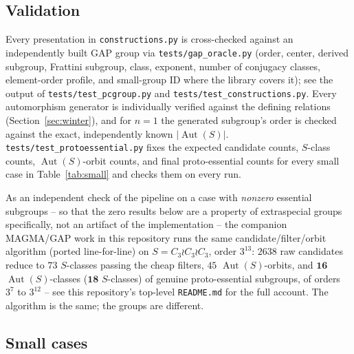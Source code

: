 \documentclass[11pt]{article}
\theoremstyle{remark}
\begin{document}
\subsection{Validation}
\label{sec:validation}

Every presentation in \texttt{constructions.py} is cross-checked against an
independently built GAP group via \texttt{tests/gap\_oracle.py} (order,
center, derived subgroup, Frattini subgroup, class, exponent, number of
conjugacy classes, element-order profile, and small-group ID where the
library covers it); see the output of \texttt{tests/test\_pcgroup.py} and
\texttt{tests/test\_constructions.py}. Every automorphism generator is
individually verified against the defining relations
(Section~\ref{sec:winter}), and for $n=1$ the generated subgroup's order is
checked against the exact, independently known $|\operatorname{Aut}(S)|$.
\texttt{tests/test\_protoessential.py} fixes the expected candidate counts,
$S$-class counts, $\operatorname{Aut}(S)$-orbit counts, and final
proto-essential counts for every small case in Table~\ref{tab:small} and
checks them on every run.

As an independent check of the pipeline on a case with \emph{nonzero}
essential subgroups -- so that the zero results below are a property of
extraspecial groups specifically, not an artifact of the implementation --
the companion MAGMA/GAP work in this repository runs the same
candidate/filter/orbit algorithm (ported line-for-line) on $S = C_3 \wr C_3
\wr C_3$, order $3^{13}$: $2638$ raw candidates reduce to $73$
$S$-classes passing the cheap filters, $45$ $\operatorname{Aut}(S)$-orbits,
and $\mathbf{16}$ $\operatorname{Aut}(S)$-classes ($\mathbf{18}$
$S$-classes) of genuine proto-essential subgroups, of orders $3^7$ to
$3^{12}$ -- see this repository's top-level \texttt{README.md} for the full
account. The algorithm is the same; the groups are different.

\subsection{Small cases}
\end{document}
